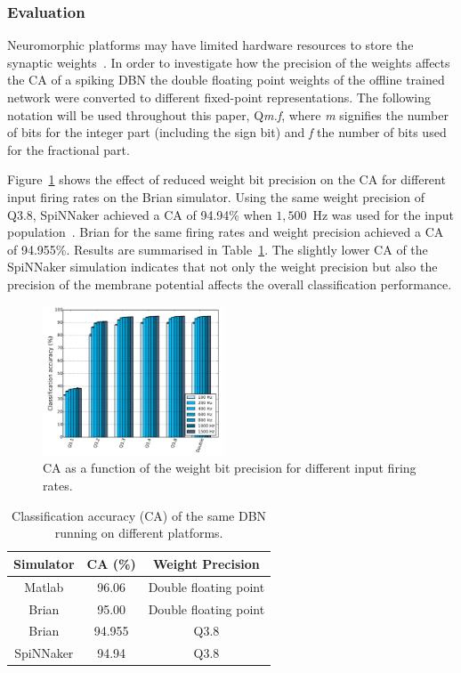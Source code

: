 \documentclass{frontiersENG} %
\begin{document}
\subsubsection{Evaluation}
Neuromorphic platforms may have limited hardware resources to store the synaptic weights~\citep{schemmel2010wafer,merolla2014million}. In order to investigate how the precision of the weights affects the CA of a spiking DBN the double floating point weights of the offline trained network were converted to different fixed-point representations. The following notation will be used throughout this paper, Q\textit{m.f}, where \textit{m} signifies the number of bits for the integer part (including the sign bit) and \textit{f} the number of bits used for the fractional part.

Figure~\ref{Fig:brianCAfiringrate} shows the effect of reduced weight bit precision on the CA for different input firing rates on the Brian simulator.
Using the same weight precision of Q3.8, SpiNNaker achieved a CA of 94.94\% when $1,500$~Hz was used for the input population~\citep{Stromatias2015scalable}. Brian for the same firing rates and weight precision achieved a CA of 94.955\%. Results are summarised in Table~\ref{tab:casimulators}.
The slightly lower CA of the SpiNNaker simulation indicates that not only the weight precision but also the precision of the membrane potential affects the overall classification performance.    

\begin{figure}[hbt!]
	\centering
	\includegraphics[width=0.48\textwidth]{fig9}
	\caption{CA as a function of the weight bit precision for different input firing rates.}
	\label{Fig:brianCAfiringrate}
\end{figure} 


\begin{table}[h]
	\caption{Classification accuracy (CA) of the same DBN running on different platforms.}
	\begin{center}
		\begin{tabular} {c|c|c}
			Simulator & CA (\%) & Weight Precision \\
			\hline
			Matlab & 96.06 & Double floating point\\
			Brian & 95.00 & Double floating point\\
			Brian & 94.955 & Q3.8\\
			SpiNNaker & 94.94 & Q3.8\\
		\end{tabular}
		\label{tab:casimulators}
	\end{center}
\end{table}
\end{document}
